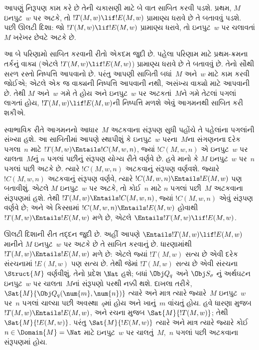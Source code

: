 \begin{explain}
આપણું નિરૂપણ કામ કરે છે તેની ચકાસણી માટે બે વાત
સાબિત કરવી પડશે. પ્રથમ, $M$ ઇનપુટ~$w$ પર અટકે,
તો $!T(M, w) \lif !E(M, w)$ પ્રામાણ્ય ધરાવે છે તે
બતાવવું પડશે. પછી ઊલટી દિશા: જો
$!T(M, w) \lif !E(M, w)$ પ્રામાણ્ય ધરાવે, તો
ઇનપુટ~$w$ પર ચલાવતાં $M$ ખરેખર છેવટે અટકે છે.

આ બે પરિણામો સાબિત કરવાની રીતો એકદમ જુદી છે.
પહેલા પરિણામ માટે પ્રથમ-ક્રમના તર્કનું વાક્ય
(એટલે $!T(M, w) \lif !E(M, w)$) પ્રામાણ્ય ધરાવે છે
તે બતાવવું છે. તેનો સૌથી સરળ રસ્તો નિષ્પત્તિ
આપવાનો છે. પરંતુ આપણી સાબિતી બધાં~$M$ અને~$w$
માટે કામ કરવી જોઈએ; એટલે એક જ વાક્યની
નિષ્પત્તિ આપવાની નથી, અસંખ્ય વાક્યો માટે
આપવાની છે. તેથી $M$ અને~$w$ ગમે તે હોય અને
ઇનપુટ~$w$ પર અટકતાં~$M$ને ગમે તેટલાં પગલાં લાગતાં
હોય, $!T(M, w) \lif !E(M, w)$ની નિષ્પત્તિ
મળશે એવું આગમનથી સાબિત કરી શકીએ.

સ્વાભાવિક રીતે આગમનનો આધાર~$M$ અટકવાના સંરૂપણ
સુધી પહોંચે તે પહેલાંના પગલાંની સંખ્યા હશે. આ
સાબિતીમાં આપણે સ્થાપીશું કે ઇનપુટ~$w$ પરના~$M$ના
સંગણનના દરેક પગલા~$n$ માટે
$!T(M, w) \Entails !C(M, w, n)$, જ્યાં
$!C(M, w, n)$ એ ઇનપુટ~$w$ પર ચાલતા~$M$નું
$n$ પગલાં પછીનું સંરૂપણ યોગ્ય રીતે વર્ણવે છે.
હવે માનો કે $M$ ઇનપુટ~$w$
પર~$n$ પગલાં પછી અટકે છે. ત્યારે
$!C(M, w, n)$ અટકવાનું સંરૂપણ વર્ણવશે. જ્યારે
$!C(M, w, n)$ અટકવાનું સંરૂપણ વર્ણવે, ત્યારે
$!C(M, w, n) \Entails !E(M, w)$ પણ બતાવીશું.
  એટલે $M$ ઇનપુટ~$w$ પર અટકે, તો કોઈ~$n$ માટે
$n$ પગલાં પછી~$M$ અટકવાના સંરૂપણમાં હશે. તેથી
$!T(M, w) \Entails !C(M, w, n)$, જ્યાં
$!C(M, w, n)$ એવું સંરૂપણ વર્ણવે છે; અને એ કિસ્સામાં
$!C(M, w, n) \Entails !E(M, w)$ હોવાથી
$!T(M, w) \Entails !E(M, w)$ મળે છે, એટલે
$\Entails !T(M, w) \lif !E(M, w)$.

ઊલટી દિશાની રીત તદ્દન જુદી છે. અહીં આપણે
$\Entails !T(M, w) \lif !E(M, w)$ માનીને
$M$ ઇનપુટ~$w$ પર અટકે છે તે સાબિત કરવાનું છે.
ધારણામાંથી $!T(M, w) \Entails !E(M, w)$ મળે છે:
એટલે જ્યાં $!T(M, w)$ સત્ય છે એવી દરેક
સંરચનામાં $!E(M, w)$ પણ સત્ય છે. તેથી
જેમાં $!T(M, w)$ સત્ય છે એવી
સંરચના~$\Struct{M}$ વર્ણવીશું. તેનો પ્રદેશ
$\Nat$ હશે; બધાં $\Obj Q_q$ અને $\Obj S_\sigma$
નું અર્થઘટન ઇનપુટ~$w$ પર ચાલતા~$M$નાં
સંરૂપણો પરથી નક્કી થશે. દાખલા તરીકે,
$\Sat{M}{\Obj Q_q(\num{m}, \num{n})}$ ત્યારે અને માત્ર
ત્યારે જ્યારે~$M$ ઇનપુટ~$w$ પર~$n$ પગલાં ચાલ્યા
પછી અવસ્થા~$q$માં હોય અને ખાનું~$m$ વાંચતું હોય.
હવે ધારણા મુજબ $!T(M, w) \Entails !E(M, w)$,
અને રચના મુજબ $\Sat{M}{!T(M, w)}$;
તેથી $\Sat{M}{!E(M, w)}$. પરંતુ
$\Sat{M}{!E(M, w)}$ ત્યારે અને માત્ર ત્યારે જ્યારે
કોઈ $n \in \Domain{M} = \Nat$ માટે ઇનપુટ~$w$
પર ચાલતું~$M$,~$n$ પગલાં પછી અટકવાના
સંરૂપણમાં હોય.
\end{explain}

